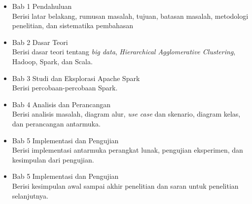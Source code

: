 \begin{itemize}

\item Bab 1 Pendahuluan\\
Berisi latar belakang, rumusan masalah, tujuan, batasan masalah, metodologi penelitian, dan
sistematika pembahasan

\item Bab 2 Dasar Teori\\
Berisi dasar teori tentang \textit{big data}, \textit{Hierarchical Agglomerative Clustering}, Hadoop, Spark, dan Scala.

\item Bab 3 Studi dan Eksplorasi Apache Spark\\
Berisi percobaan-percobaan Spark.

\item Bab 4 Analisis dan Perancangan\\
Berisi analisis masalah, diagram alur, \textit{use case} dan skenario, diagram kelas, dan perancangan antarmuka.

\item Bab 5 Implementasi dan Pengujian\\
Berisi implementasi antarmuka perangkat lunak, pengujian eksperimen, dan kesimpulan dari pengujian.

\item Bab 5 Implementasi dan Pengujian\\
Berisi kesimpulan awal sampai akhir penelitian dan saran untuk penelitian selanjutnya.


\end{itemize}


